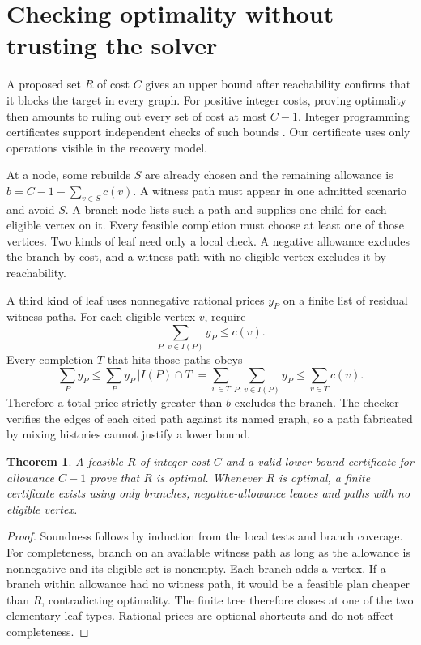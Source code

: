 \documentclass[11pt]{article}
\newtheorem{theorem}{Theorem}
\begin{document}
\section{Checking optimality without trusting the solver}
A proposed set $R$ of cost $C$ gives an upper bound after
reachability confirms that it blocks the target in every graph.
For positive integer costs, proving optimality then amounts to
ruling out every set of cost at most $C-1$. Integer programming
certificates support independent checks of such bounds \cite{vipr}.
Our certificate uses only operations visible in the recovery model.

At a node, some rebuilds $S$ are already chosen and the remaining
allowance is $b=C-1-\sum_{v\in S}c(v)$. A witness path must
appear in one admitted scenario and avoid $S$. A branch node
lists such a path and supplies one child for each eligible vertex
on it. Every feasible completion must choose at least one of
those vertices. Two kinds of leaf need only a local check.
A negative allowance excludes the branch by cost, and a witness
path with no eligible vertex excludes it by reachability.

A third kind of leaf uses nonnegative rational prices $y_P$ on
a finite list of residual witness paths. For each eligible
vertex $v$, require
\[
\sum_{P:\,v\in I(P)} y_P\le c(v).
\]
Every completion $T$ that hits those paths obeys
\[
\sum_{P}y_P
\le \sum_P y_P\,|I(P)\cap T|
= \sum_{v\in T}\sum_{P:\,v\in I(P)}y_P
\le \sum_{v\in T}c(v).
\]
Therefore a total price strictly greater than $b$ excludes the
branch. The checker verifies the edges of each cited path against
its named graph, so a path fabricated by mixing histories cannot
justify a lower bound.

\begin{theorem}
A feasible $R$ of integer cost $C$ and a valid lower-bound
certificate for allowance $C-1$ prove that $R$ is optimal.
Whenever $R$ is optimal, a finite certificate exists using only
branches, negative-allowance leaves and paths with no eligible
vertex.
\end{theorem}
\begin{proof}
Soundness follows by induction from the local tests and branch
coverage. For completeness, branch on an available witness path
as long as the allowance is nonnegative and its eligible set is
nonempty. Each branch adds a vertex. If a branch within allowance
had no witness path, it would be a feasible plan cheaper than
$R$, contradicting optimality. The finite tree therefore closes
at one of the two elementary leaf types. Rational prices are
optional shortcuts and do not affect completeness.
\end{proof}
\end{document}
